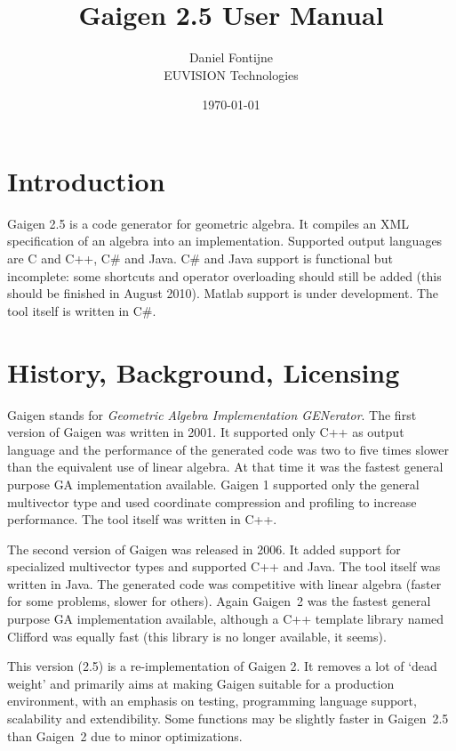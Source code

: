 \documentclass[10pt, a4paper]{article}
\begin{document}
\title{Gaigen 2.5 User Manual}
\author{
Daniel Fontijne\\EUVISION Technologies
}
\date{\today}
\maketitle

\section{Introduction}

Gaigen 2.5 is a code generator for geometric algebra. It compiles an XML specification
of an algebra into an implementation. Supported output languages are C and C++,
C\# and Java. C\# and Java support is functional but incomplete: some shortcuts and operator
overloading should still be added (this should be finished in August 2010). 
Matlab support is under development. The tool itself is written in C\#.

\section{History, Background, Licensing}

Gaigen stands for \emph{Geometric Algebra Implementation GENerator}.
The first version of Gaigen was written in 2001. It supported only C++ as output language
and the performance of the generated code was two to five times slower than the equivalent
use of linear algebra. At that time it was the fastest general purpose GA implementation available. 
Gaigen 1 supported only the general multivector type and used coordinate  compression and profiling 
to increase performance. The tool itself was written in C++.

The second version of Gaigen was released in 2006. It added support for specialized multivector
types and supported C++ and Java. The tool itself was written in Java.
The generated code was competitive with linear algebra (faster for some problems, slower for others).
Again Gaigen~2 was the fastest general purpose GA implementation available, although a 
C++ template library named Clifford was equally fast (this library is no longer available,
it seems).

This version (2.5) is a re-implementation of Gaigen 2. It removes a lot of `dead weight' and
primarily aims at making Gaigen suitable for a production environment, with an emphasis on
testing, programming language support, scalability and extendibility. Some functions may be
slightly faster in Gaigen~2.5 than Gaigen~2 due to minor optimizations.
\end{document}
